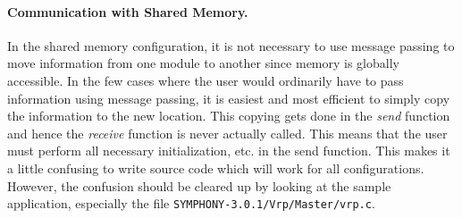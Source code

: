 \paragraph{Communication with Shared Memory.}
\label{shared}
In the shared memory configuration, it is not necessary to use
message passing to move information from one module to another since
memory is globally accessible. In the few cases where the user would
ordinarily have to pass information using message passing, it is
easiest and most efficient to simply copy the information to the new
location. This copying gets done in the {\em send} function and hence
the {\em receive} function is never actually called. This means that
the user must perform all necessary initialization, etc. in the send
function. This makes it a little confusing to write source code which
will work for all configurations. However, the confusion should be
cleared up by looking at the sample application, especially the file
{\tt SYMPHONY-3.0.1/Vrp/Master/vrp.c}.

